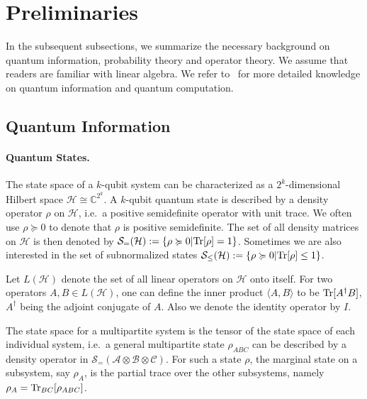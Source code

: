
\newcommand{\X}{\mathcal{X}}
\newcommand{\Y}{\mathcal{Y}}
\newcommand{\St}{\mathcal{S}}
\newcommand{\I}{\mathcal{I}}
\newcommand{\hro}{\hat{\rho}}
\newcommand{\Supp}{\mathrm{Supp}}
\newtheorem{conj}{Conjecture}

\section{Preliminaries}
In the subsequent subsections, we summarize the necessary background on quantum information, probability theory and operator theory. We assume that readers are familiar with linear algebra. We refer to~\cite{nielsen2010quantum} for more detailed knowledge on quantum information and quantum computation.
\subsection{Quantum Information}
\paragraph{Quantum States.} The state space of a $k$-qubit system can be characterized as a $2^k$-dimensional Hilbert space $\mathcal{H}\cong\mathbb{C}^{2^k}$. A $k$-qubit quantum state is described by a density operator $\rho$ on $\mathcal{H}$, i.e.\ a positive semidefinite operator with unit trace. We often use $\rho\succcurlyeq 0$ to denote that $\rho$ is positive semidefinite. The set of all density matrices on $\mathcal{H}$ is then denoted by $\mathcal{S}_{=}(\mathcal{H}):=\{\rho\succcurlyeq 0|\textnormal{Tr}[\rho]=1\}$. Sometimes we are
        also interested in the set of subnormalized states $\mathcal{S}_{\leq }(\mathcal{H}):=\{\rho\succcurlyeq 0|\textnormal{Tr}[\rho]\leq 1\}$.

        Let $L(\mathcal{H})$ denote the set of all linear operators on $\mathcal{H}$ onto itself. For two operators $A,B\in L(\mathcal{H})$, one can define the inner product $\langle A,B\rangle$ to be $\textnormal{Tr}[A^\dag B]$, $A^\dag$ being the adjoint conjugate of $A$. Also we denote the identity operator by $I$.

        The state space for a multipartite system is the tensor of the state space of each individual system, i.e.\ a general multipartite state $\rho_{ABC}$ can be described by a density operator in $\mathcal{S}_{=}(\mathcal{A}\otimes \mathcal{B}\otimes \mathcal{C})$. For such a state $\rho$, the marginal state on a subsystem, say $\rho_A$, is the partial trace over the other subsystems, namely $\rho_A=\textnormal{Tr}_{BC}[\rho_{ABC}]$.

